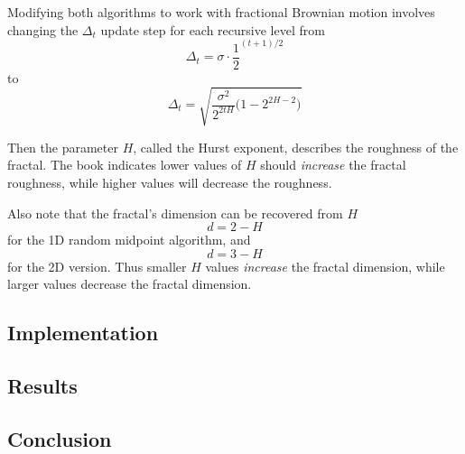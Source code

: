 Modifying both algorithms to work with fractional Brownian motion involves changing the $\Delta_t$ update step for each recursive level from
\begin{equation}
    \Delta_t = \sigma \cdot \frac{1}{2}^{(t + 1) / 2}\label{prob3:eqn:rmd-Delta}
\end{equation}
to
\begin{equation}
    \Delta_t = \sqrt{\frac{\sigma^2}{2^{2tH}} \big(1 - 2 ^ {2 H - 2}\big)}\label{prob3:eqn:fBm-Delta}
\end{equation}

Then the parameter $H$, called the Hurst exponent, describes the roughness of the fractal.
The book indicates lower values of $H$ should \textit{increase} the fractal roughness, while higher values will decrease the roughness.

Also note that the fractal's dimension can be recovered from $H$
\begin{equation}
    d = 2 - H\label{prob3:eqn:fractal-dimension-1d}
\end{equation}
for the 1D random midpoint algorithm, and
\begin{equation}
    d = 3 - H\label{prob3:eqn:fractal-dimension-2d}
\end{equation}
for the 2D version.
Thus smaller $H$ values \textit{increase} the fractal dimension, while larger values decrease the fractal dimension.

\subsection{Implementation}
\subsection{Results}
\subsection{Conclusion}
